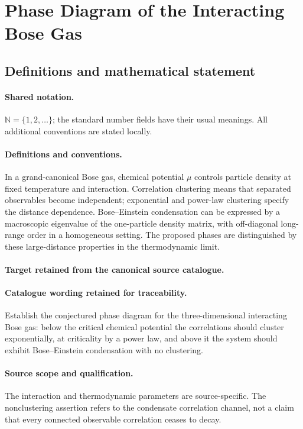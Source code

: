 \documentclass[11pt]{article}
\begin{document}
\section{Phase Diagram of the Interacting Bose Gas}\label{statement}

\subsection{Definitions and mathematical statement}

\paragraph{Shared notation.}$\mathbb N=\{1,2,\ldots\}$; the standard number fields have their usual meanings. All additional conventions are stated locally.


\paragraph{Definitions and conventions.}
In a grand-canonical Bose gas, chemical potential $\mu$ controls particle density at fixed temperature and interaction. Correlation clustering means that separated observables become independent; exponential and power-law clustering specify the distance dependence. Bose--Einstein condensation can be expressed by a macroscopic eigenvalue of the one-particle density matrix, with off-diagonal long-range order in a homogeneous setting. The proposed phases are distinguished by these large-distance properties in the thermodynamic limit.

\paragraph{Target retained from the canonical source catalogue.}
\paragraph{Catalogue wording retained for traceability.}
Establish the conjectured phase diagram for the three-dimensional interacting Bose gas: below the critical chemical potential the correlations should cluster exponentially, at criticality by a power law, and above it the system should exhibit Bose–Einstein condensation with no clustering.

\paragraph{Source scope and qualification.}
The interaction and thermodynamic parameters are source-specific. The nonclustering assertion refers to the condensate correlation channel, not a claim that every connected observable correlation ceases to decay.
\end{document}
